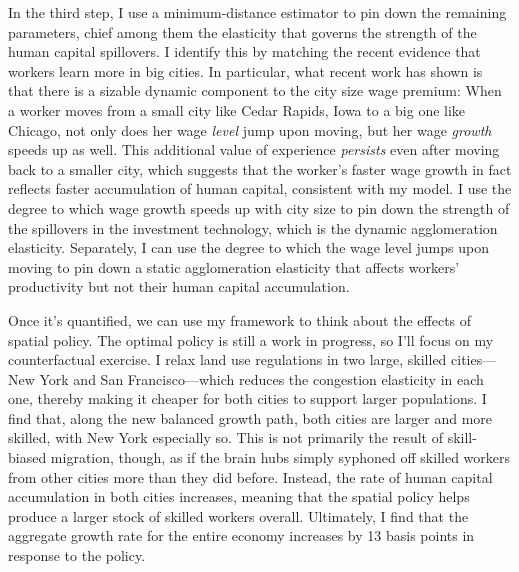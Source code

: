 \documentclass{jmstatement}
\begin{document}
In the third step, I use a minimum-distance estimator to pin down the remaining
parameters, chief among them the elasticity that governs the strength of the
human capital spillovers.
I identify this by matching the recent evidence that workers learn more in big cities.
In particular, what recent work has shown is that there is a sizable dynamic component
to the city size wage premium: When a worker moves from a small city like Cedar
Rapids, Iowa to a big one like Chicago, not only does her wage \textit{level}
jump upon moving, but her wage \textit{growth} speeds up as well. This
additional value of experience \textit{persists} even after moving back to a
smaller city, which suggests that the worker's faster wage growth in fact
reflects faster accumulation of human capital, consistent with my model.
I use the degree to which wage growth speeds up with city size to pin down
the strength of the spillovers in the investment technology, which is the
dynamic agglomeration elasticity.
Separately, I can use the degree to which the wage level jumps upon moving
to pin down a static agglomeration elasticity that affects workers' productivity
but not their human capital accumulation.

Once it's quantified, we can use my framework to think about the effects of spatial policy.
The optimal policy is still a work in progress,
so I'll focus on my counterfactual exercise.
I relax land use regulations in two large, skilled cities---New York and San
Francisco---which reduces the congestion elasticity in each one, thereby
making it cheaper for both cities to support larger populations.
I find that, along the new balanced growth path, both cities are larger and more
skilled, with New York especially so.
This is not primarily the result of skill-biased migration, though, as if the
brain hubs simply syphoned off skilled workers from other cities more than they
did before. Instead, the rate of human capital accumulation in both cities
increases, meaning that the spatial policy helps produce a larger stock of
skilled workers overall.
Ultimately, I find that the aggregate growth rate for the entire economy
increases by 13 basis points in response to the policy.
\end{document}
